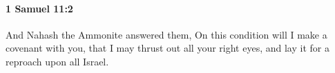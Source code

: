 
		\paragraph{1 Samuel 11:2} %
			\label{1SAMUEL-11-2}

			And Nahash the Ammonite answered them, On this condition will I make a covenant with you, that I may thrust out all your right eyes, and lay it for a reproach upon all Israel.


